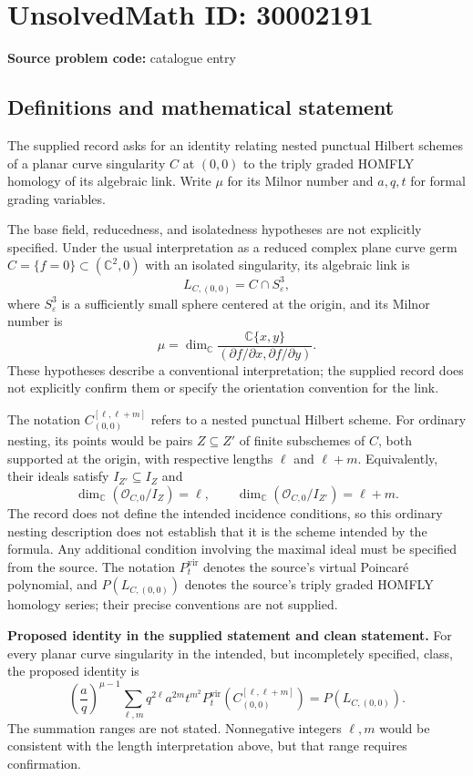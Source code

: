 \documentclass[11pt]{article}
\newcommand{\C}{\mathbb{C}}
\begin{document}
\section*{UnsolvedMath ID: 30002191}
\textbf{Source problem code:} catalogue entry
\subsection{Definitions and mathematical statement}
The supplied record asks for an identity relating nested punctual Hilbert schemes of a planar curve singularity \(C\) at \((0,0)\) to the triply graded HOMFLY homology of its algebraic link. Write \(\mu\) for its Milnor number and \(a,q,t\) for formal grading variables.

The base field, reducedness, and isolatedness hypotheses are not explicitly specified. Under the usual interpretation as a reduced complex plane curve germ \(C=\{f=0\}\subset(\C^2,0)\) with an isolated singularity, its algebraic link is
\[
L_{C,(0,0)}=C\cap S^3_{\varepsilon},
\]
where \(S^3_{\varepsilon}\) is a sufficiently small sphere centered at the origin, and its Milnor number is
\[
\mu=\dim_{\C}\frac{\C\{x,y\}}{(\partial f/\partial x,\partial f/\partial y)}.
\]
These hypotheses describe a conventional interpretation; the supplied record does not explicitly confirm them or specify the orientation convention for the link.

The notation \(C_{(0,0)}^{[\ell,\ell+m]}\) refers to a nested punctual Hilbert scheme. For ordinary nesting, its points would be pairs \(Z\subseteq Z'\) of finite subschemes of \(C\), both supported at the origin, with respective lengths \(\ell\) and \(\ell+m\). Equivalently, their ideals satisfy \(I_{Z'}\subseteq I_Z\) and
\[
\dim_{\C}(\mathcal O_{C,0}/I_Z)=\ell,
\qquad
\dim_{\C}(\mathcal O_{C,0}/I_{Z'})=\ell+m.
\]
The record does not define the intended incidence conditions, so this ordinary nesting description does not establish that it is the scheme intended by the formula. Any additional condition involving the maximal ideal must be specified from the source. The notation \(P_t^{\mathrm{vir}}\) denotes the source's virtual Poincar\'e polynomial, and \(P(L_{C,(0,0)})\) denotes the source's triply graded HOMFLY homology series; their precise conventions are not supplied.

\textbf{Proposed identity in the supplied statement and clean statement.} For every planar curve singularity in the intended, but incompletely specified, class, the proposed identity is
\[
\left(\frac aq\right)^{\mu-1}
\sum_{\ell,m}q^{2\ell}a^{2m}t^{m^2}
P_t^{\mathrm{vir}}\!\left(C_{(0,0)}^{[\ell,\ell+m]}\right)
=P(L_{C,(0,0)}).
\]
The summation ranges are not stated. Nonnegative integers \(\ell,m\) would be consistent with the length interpretation above, but that range requires confirmation.
\end{document}
